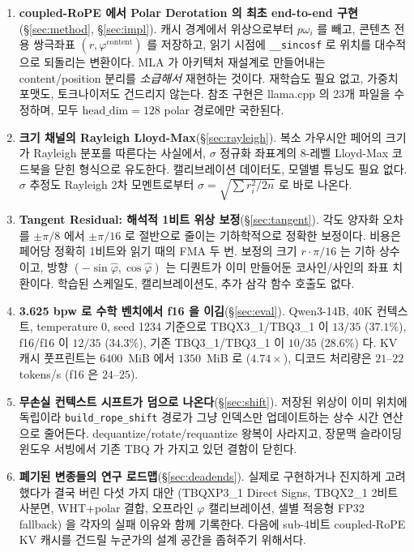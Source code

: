 \documentclass[10pt,twocolumn]{article}
\begin{document}
\begin{enumerate}[leftmargin=*,topsep=2pt,itemsep=1pt]
\item \textbf{coupled-RoPE 에서 Polar Derotation 의 최초 end-to-end 구현}(\S\ref{sec:method}, \S\ref{sec:impl}). 캐시 경계에서 위상으로부터 $p\omega_i$ 를 빼고, 콘텐츠 전용 쌍극좌표 $(r,\varphi^{\text{content}})$ 를 저장하고, 읽기 시점에 \texttt{\_\_sincosf} 로 위치를 대수적으로 되돌리는 변환이다. MLA 가 아키텍처 재설계로 만들어내는 content/position 분리를 \emph{소급해서} 재현하는 것이다. 재학습도 필요 없고, 가중치 포맷도, 토크나이저도 건드리지 않는다. 참조 구현은 llama.cpp 의 23개 파일을 수정하며, 모두 $\text{head\_dim}=128$ polar 경로에만 국한된다.
\item \textbf{크기 채널의 Rayleigh Lloyd-Max}(\S\ref{sec:rayleigh}). 복소 가우시안 페어의 크기가 Rayleigh 분포를 따른다는 사실에서, $\sigma$ 정규화 좌표계의 8-레벨 Lloyd-Max 코드북을 닫힌 형식으로 유도한다. 캘리브레이션 데이터도, 모델별 튜닝도 필요 없다. $\sigma$ 추정도 Rayleigh 2차 모멘트로부터 $\hat\sigma = \sqrt{\sum r_i^2 / 2n}$ 로 바로 나온다.
\item \textbf{Tangent Residual: 해석적 1비트 위상 보정}(\S\ref{sec:tangent}). 각도 양자화 오차를 $\pm\pi/8$ 에서 $\pm\pi/16$ 로 절반으로 줄이는 기하학적으로 정확한 보정이다. 비용은 페어당 정확히 1비트와 읽기 때의 FMA 두 번. 보정의 크기 $r\cdot\pi/16$ 는 기하 상수이고, 방향 $(-\sin\hat\varphi,\cos\hat\varphi)$ 는 디퀀트가 이미 만들어둔 코사인/사인의 좌표 치환이다. 학습된 스케일도, 캘리브레이션도, 추가 삼각 함수 호출도 없다.
\item \textbf{3.625 bpw 로 수학 벤치에서 f16 을 이김}(\S\ref{sec:eval}). Qwen3-14B, 40K 컨텍스트, temperature $0$, seed 1234 기준으로 TBQX3\_1/TBQ3\_1 이 $13/35$ ($37.1\%$), f16/f16 이 $12/35$ ($34.3\%$), 기존 TBQ3\_1/TBQ3\_1 이 $10/35$ ($28.6\%$) 다. KV 캐시 풋프린트는 $6400$~MiB 에서 $1350$~MiB 로 ($4.74\times$), 디코드 처리량은 $21$--$22$ tokens/s (f16 은 $24$--$25$).
\item \textbf{무손실 컨텍스트 시프트가 덤으로 나온다}(\S\ref{sec:shift}). 저장된 위상이 이미 위치에 독립이라 \texttt{build\_rope\_shift} 경로가 그냥 인덱스만 업데이트하는 상수 시간 연산으로 줄어든다. dequantize/rotate/requantize 왕복이 사라지고, 장문맥 슬라이딩 윈도우 서빙에서 기존 TBQ 가 가지고 있던 결함이 닫힌다.
\item \textbf{폐기된 변종들의 연구 로드맵}(\S\ref{sec:deadends}). 실제로 구현하거나 진지하게 고려했다가 결국 버린 다섯 가지 대안 (TBQXP3\_1 Direct Signs, TBQX2\_1 2비트 사분면, WHT+polar 결합, 오프라인 $\varphi$ 캘리브레이션, 셀별 적응형 FP32 fallback) 을 각자의 실패 이유와 함께 기록한다. 다음에 sub-4비트 coupled-RoPE KV 캐시를 건드릴 누군가의 설계 공간을 좁혀주기 위해서다.
\end{enumerate}
\end{document}
